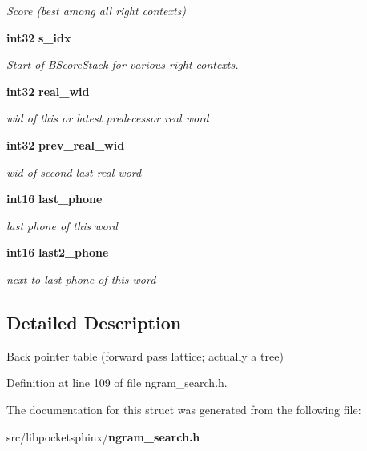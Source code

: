\begin{DoxyCompactItemize}
\begin{DoxyCompactList}\small\item\em \-Score (best among all right contexts) \end{DoxyCompactList}\item 
{\bf int32} {\bf s\-\_\-idx}\label{structbptbl__s_abf9e4bcf1927aa09fb2b30c59e99f551}

\begin{DoxyCompactList}\small\item\em \-Start of \-B\-Score\-Stack for various right contexts. \end{DoxyCompactList}\item 
{\bf int32} {\bf real\-\_\-wid}\label{structbptbl__s_a91247e4f807cf780afe8f5ac45e720b8}

\begin{DoxyCompactList}\small\item\em wid of this or latest predecessor real word \end{DoxyCompactList}\item 
{\bf int32} {\bf prev\-\_\-real\-\_\-wid}\label{structbptbl__s_a83784e3b0121bc365d485151ab277920}

\begin{DoxyCompactList}\small\item\em wid of second-\/last real word \end{DoxyCompactList}\item 
{\bf int16} {\bf last\-\_\-phone}\label{structbptbl__s_aa7704ba76d3dcde6b8a24855362a4289}

\begin{DoxyCompactList}\small\item\em last phone of this word \end{DoxyCompactList}\item 
{\bf int16} {\bf last2\-\_\-phone}\label{structbptbl__s_a27b8e54bb7552e6afc15e4f44f42e3b7}

\begin{DoxyCompactList}\small\item\em next-\/to-\/last phone of this word \end{DoxyCompactList}\end{DoxyCompactItemize}


\subsection{\-Detailed \-Description}
\-Back pointer table (forward pass lattice; actually a tree) 

\-Definition at line 109 of file ngram\-\_\-search.\-h.



\-The documentation for this struct was generated from the following file\-:\begin{DoxyCompactItemize}
\item 
src/libpocketsphinx/{\bf ngram\-\_\-search.\-h}\end{DoxyCompactItemize}
